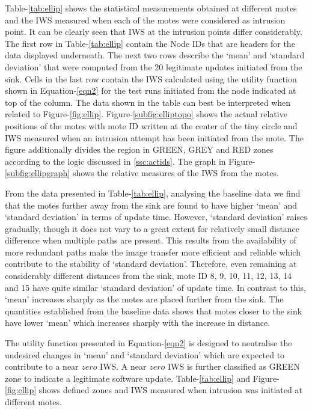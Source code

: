 \documentclass[conference,final]{IEEEtran}
\begin{document}
Table-\ref{tab:ellip} shows the statistical measurements obtained at different motes and the IWS measured when each of the motes were considered as intrusion point.
It can be clearly seen that IWS at the intrusion points differ considerably.
The first row in Table-\ref{tab:ellip} contain the Node IDs that are headers for the data displayed underneath.
The next two rows describe the `mean' and `standard deviation' that were computed from the 20 legitimate updates initiated from the sink.
Cells in the last row contain the IWS calculated using  the utility function shown in Equation-\ref{eqn2} for the test runs initiated from the node indicated at top of the column.
The data shown in the table can best be interpreted when related to Figure-\ref{fig:ellip}. 
Figure-\ref{subfig:elliptopo} shows the actual relative positions of the motes with mote ID written at the center of the tiny circle and IWS measured when an intrusion attempt has been initiated from the mote. 
The figure additionally divides the region in GREEN, GREY and RED zones according to the logic discussed in \ref{ssc:actids}.
The graph in  Figure-\ref{subfig:ellipgraph} shows the relative measures of the IWS from the motes.

From the data presented in Table-\ref{tab:ellip}, analysing the baseline data we find that the motes further away from the sink are found to have higher `mean' and `standard deviation' in terms of update time.  
However, `standard deviation' raises gradually, though it does not vary to a great extent for relatively small distance difference when multiple paths are present.
This results from the  availability of more redundant paths make the image transfer more efficient and reliable which contribute to the stability of `standard deviation'.
Therefore, even remaining at considerably different distances from the sink, mote ID 8, 9, 10, 11, 12, 13, 14 and 15  have quite similar `standard deviation' of update time.
In contrast to this, `mean' increases sharply as the motes are placed further from the sink.
The quantities established from the baseline data shows that motes closer to the sink have lower `mean' which increases sharply with the increase in distance.


The utility function presented in Equation-\ref{eqn2} is designed to neutralise the undesired %
changes in `mean' and `standard deviation' which are expected to contribute to a near $zero$ IWS.
A near $zero$ IWS is further classified as GREEN zone to indicate a legitimate software update. 
Table-\ref{tab:ellip} and Figure-\ref{fig:ellip} shows defined zones and IWS measured when intrusion was initiated at different motes.
\end{document}
